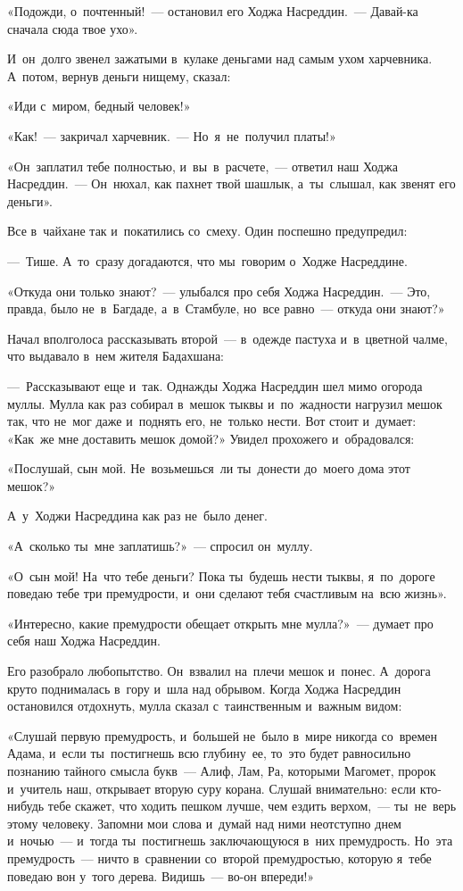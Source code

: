 \documentclass[12pt,a4paper]{book}
\begin{document}
«Подожди, о~почтенный!~— остановил его Ходжа Насреддин.~— Давай-ка сначала сюда твое ухо».

И~он~долго звенел зажатыми в~кулаке деньгами над самым ухом харчевника. А~потом, вернув деньги нищему, сказал:

«Иди с~миром, бедный человек!»

«Как!~— закричал харчевник.~— Но~я~не~получил платы!»

«Он~заплатил тебе полностью, и~вы~в~расчете,~— ответил наш Ходжа Насреддин.~— Он~нюхал, как пахнет твой шашлык, а~ты~слышал, как звенят его деньги».

Все в~чайхане так и~покатились со~смеху. Один поспешно предупредил:

—~Тише. А~то~сразу догадаются, что мы~говорим о~Ходже Насреддине.

«Откуда они только знают?~— улыбался про себя Ходжа Насреддин.~— Это, правда, было не~в~Багдаде, а~в~Стамбуле, но~все равно~— откуда они знают?»

Начал вполголоса рассказывать второй~— в~одежде пастуха и~в~цветной чалме, что выдавало в~нем жителя Бадахшана:

—~Рассказывают еще и~так. Однажды Ходжа Насреддин шел мимо огорода муллы. Мулла как раз собирал в~мешок тыквы и~по~жадности нагрузил мешок так, что не~мог даже и~поднять его, не~только нести. Вот стоит и~думает: «Как~же мне доставить мешок домой?» Увидел прохожего и~обрадовался:

«Послушай, сын мой. Не~возьмешься~ли ты~донести до~моего дома этот мешок?»

А~у~Ходжи Насреддина как раз не~было денег.

«А~сколько ты~мне заплатишь?»~— спросил он~муллу.

«О~сын мой! На~что тебе деньги? Пока ты~будешь нести тыквы, я~по~дороге поведаю тебе три премудрости, и~они сделают тебя счастливым на~всю жизнь».

«Интересно, какие премудрости обещает открыть мне мулла?»~— думает про себя наш Ходжа Насреддин.

Его разобрало любопытство. Он~взвалил на~плечи мешок и~понес. А~дорога круто поднималась в~гору и~шла над обрывом. Когда Ходжа Насреддин остановился отдохнуть, мулла сказал с~таинственным и~важным видом:

«Слушай первую премудрость, и~большей не~было в~мире никогда со~времен Адама, и~если ты~постигнешь всю глубину~ее, то~это будет равносильно познанию тайного смысла букв~— Алиф, Лам, Ра, которыми Магомет, пророк и~учитель наш, открывает вторую суру корана. Слушай внимательно: если кто-нибудь тебе скажет, что ходить пешком лучше, чем ездить верхом,~— ты~не~верь этому человеку. Запомни мои слова и~думай над ними неотступно днем и~ночью~— и~тогда ты~постигнешь заключающуюся в~них премудрость. Но~эта премудрость~— ничто в~сравнении со~второй премудростью, которую я~тебе поведаю вон у~того дерева. Видишь~— во-он впереди!»
\end{document}
